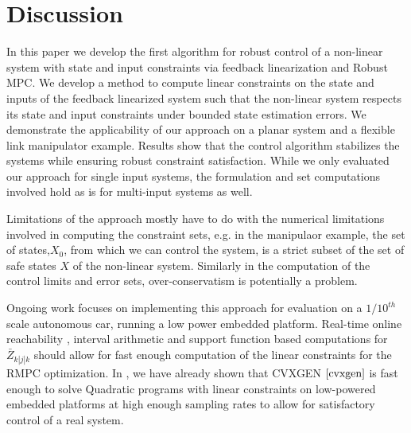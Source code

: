 \section{Discussion}

In this paper we develop the first algorithm for robust control of a non-linear system with state and input constraints via feedback linearization and Robust MPC. %
We develop a method to compute linear constraints on the state and inputs of the feedback linearized system such that the non-linear system respects its state and input constraints under bounded state estimation errors. 
We demonstrate the applicability of our approach on a planar system and a flexible link manipulator example. Results show that the control algorithm stabilizes the systems while ensuring robust constraint satisfaction.%
While we only evaluated our approach for single input systems, the formulation and set computations involved hold as is for multi-input systems as well.


Limitations of the approach mostly have to do with the numerical limitations involved in computing the constraint sets, e.g. in the manipulaor example, the set of states,$X_0$, from which we can control the system, is a strict subset of the set of safe states $X$ of the non-linear system. Similarly in the computation of the control limits and error sets, over-conservatism is potentially a problem.


Ongoing work focuses on implementing this approach for evaluation on a $1/10^{th}$ scale autonomous car, running a low power embedded platform. Real-time online reachability \cite{rtreach}, interval arithmetic%
and support function based computations for $\bar{Z}_{k|j|k}$ should allow for fast enough computation of the linear constraints for the RMPC optimization. In \cite{PantAMNDM15_Anytime}, we have already shown that CVXGEN $\cite{cvxgen}$ is fast enough to solve Quadratic programs with linear constraints on low-powered embedded platforms at high enough sampling rates to allow for satisfactory control of a real system.



